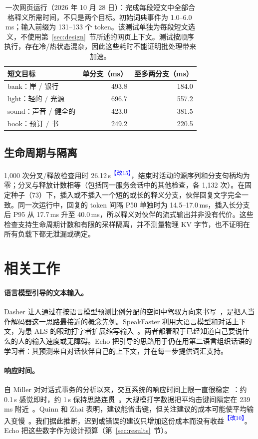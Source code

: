 \documentclass[11pt,a4paper,fontset=windows]{ctexart}
\newcommand{\audit}[1]{\textcolor{blue}{\textsuperscript{【改#1】}}}
\begin{document}
\begin{table}[ht]
\centering\small
\begin{tabular}{@{}lrr@{}}
\toprule
短文目标 & 单分支（ms） & 至多两分支（ms）\\
\midrule
bank：岸 / 银行 & 493.8 & 184.0\\
light：轻的 / 光源 & 696.7 & 557.2\\
sound：声音 / 健全的 & 423.0 & 381.5\\
book：预订 / 书 & 249.2 & 220.5\\
\bottomrule
\end{tabular}
\caption{一次网页运行（2026 年 10 月 28 日）：完成每段短文中全部合格释义所需时间，不只是两个目标。初始词典事件为 1.0--6.0\,ms；输入前缀为 131--133 个 token。该测试单独为每段短文选义，不使用第~\ref{sec:design}~节所述的网页上下文。测试按顺序执行，存在冷/热状态混杂，因此这些耗时不能证明批处理带来加速。}
\label{tab:reader}
\end{table}

\subsection{生命周期与隔离}
1,000 次分叉/释放检查用时 26.12\,s\audit{15}，结束时活动的源序列和分支句柄均为零；分叉与释放计数相等（包括同一服务会话中的其他检查，各 1,132 次）。在固定种子（73）下，插入或不插入一个短的或长的释义分支，伙伴回复文字完全一致。同一次运行中，回复的 token 间隔 P50 单独时为 14.5--17.0\,ms，插入长分支后 P95 从 17.7\,ms 升至 40.0\,ms，所以释义对伙伴的流式输出并非没有代价。这些检查支持生命周期计数和有限的采样隔离，并不测量物理 KV 字节，也不证明在所有负载下都无泄漏或确定。

\section{相关工作}
\label{sec:related}
\paragraph{语言模型引导的文本输入。}Dasher 让人通过在按语言模型预测比例分配的空间中驾驭方向来书写~\cite{dasher}，是把人当作解码器这一思路最接近的概念先例。SpeakFaster 利用大语言模型和对话上下文，为患 ALS 的眼动打字者扩展缩写输入~\cite{speakfaster}。两者都着眼于已经知道自己要说什么的人的输入速度或无障碍。Echo 把引导的思路用于仍在用第二语言组织话语的学习者：其预测来自对话伙伴自己的上下文，并在每一步提供词汇支持。

\paragraph{响应时间。}自 Miller 对对话式事务的分析以来，交互系统的响应时间上限一直很稳定~\cite{miller}：约 0.1\,s 感觉即时，约 1\,s 保持思路连贯~\cite{card,nielsen}。大规模打字数据把平均击键间隔定在 239\,ms 附近~\cite{dhakal}。Quinn 和 Zhai 表明，建议能省击键，但关注建议的成本可能使平均输入变慢~\cite{quinn}。我们据此推断，迟到或错误的建议只增加这份成本而没有收益\audit{10}。Echo 把这些数字作为设计预算（第~\ref{sec:results}~节）。
\end{document}
